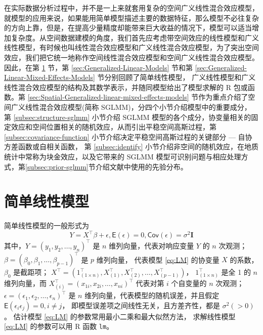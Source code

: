 \documentclass[12pt,a4paper,UTF8,twoside]{book}
\theoremstyle{definition}
\theoremstyle{definition}
\theoremstyle{definition}
\theoremstyle{remark}
\begin{document}
在实际数据分析过程中，并不是一上来就套用复杂的空间广义线性混合效应模型，就模型的应用来说，如果能用简单模型描述主要的数据特征，那么模型不必往复杂的方向上靠，但是，在提高少量精度却能带来巨大收益的情况下，模型可以适当增加复杂度。从空间数据建模的角度，我们首先应考虑带空间效应的线性模型和广义线性模型，有时候也叫线性混合效应模型和广义线性混合效应模型，为了突出空间效应，我们把它统一地称作空间线性混合效应模型和空间广义线性混合效应模型。因此，在第
\ref{sec:Linear-Models} 节，第 \ref{sec:Generalized-Linear-Models}
节和第 \ref{sec:Generalized-Linear-Mixed-Effects-Models}
节分别回顾了简单线性模型，
广义线性模型和广义线性混合效应模型的结构及其数学表示，并随同模型给出了模型求解的
R 包或函数。第 \ref{sec:Spatial-Generalized-linear-mixed-effects-models}
节作为重点介绍了空间广义线性混合效应模型(简称
SGLMM)，分四个小节介绍模型中的重要成分， 第 \ref{subsec:structure-sglmm}
小节介绍 SGLMM
模型的各个成分，协变量相关的固定效应和空间位置相关的随机效应，从而引出平稳空间高斯过程，第
\ref{subsec:covariance-function} 小节介绍决定平稳空间高斯过程的关键部分
--- 自协方差函数或自相关函数， 第 \ref{subsec:identify}
小节介绍非空间的随机效应，在地质统计中常称为块金效应，以及它带来的 SGLMM
模型可识别问题与相应处理方式，第\ref{subsec:prior-sglmm}节介绍文献中使用的先验分布。

\hypertarget{sec:Linear-Models}{%
\section{简单线性模型}\label{sec:Linear-Models}}

简单线性模型的一般形式为 \begin{equation}
Y = X^{\top}\beta + \epsilon, \mathsf{E}(\epsilon) = 0, \mathsf{Cov}(\epsilon) = \sigma^2\mathbf{I}  \label{eq:LM}
\end{equation} \noindent 其中，\(Y = (y_1,y_2,\ldots,y_n)^{\top}\) 是
\(n\) 维列向量，代表对响应变量 \(Y\) 的 \(n\) 次观测；
\(\beta = (\beta_0,\beta_1,\ldots,\beta_{p-1})^{\top}\) 是 \(p\)
维列向量， 代表模型 \eqref{eq:LM} 的协变量 \(X\) 的系数，\(\beta_0\)
是截距项；
\(X^{\top} = (1_{(1\times n)}^{\top},X_{(1)}^{\top},X_{(2)}^{\top},\ldots,X_{(p-1)}^{\top})\)，
\(1_{(1\times n)}^{\top}\) 是全 1 的 \(n\) 维列向量，而
\(X_{(i)}^{\top} = (x_{1i},x_{2i},\ldots,x_{ni})^{\top}\) 代表对第 \(i\)
个自变量的 \(n\) 次观测；
\(\epsilon = (\epsilon_1,\epsilon_2,\ldots,\epsilon_n)^{\top}\) 是 \(n\)
维列向量，代表模型的随机误差，并且假定
\(\mathsf{E}(\epsilon_i \epsilon_j) = 0, i \ne j\)，
即模型误差项之间线性无关，且方差齐性，都是 \(\sigma^2(>0)\)。 估计模型
\eqref{eq:LM} 的参数常用最小二乘和最大似然方法， 求解线性模型 \eqref{eq:LM}
的参数可以用 R 函数 \texttt{lm}。
\end{document}
